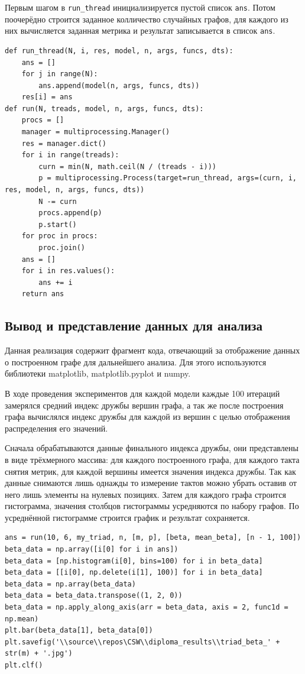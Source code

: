 \documentclass[bachelor, och, diploma]{SCWorks}
\begin{document}
Первым шагом в \texttt{run_thread} инициализируется пустой список \texttt{ans}. Потом поочерёдно строится заданное колличество случайных графов, для каждого из них вычисляется заданная метрика и результат записывается в список  \texttt{ans}.
\begin{verbatim}
def run_thread(N, i, res, model, n, args, funcs, dts):
    ans = []
    for j in range(N):
        ans.append(model(n, args, funcs, dts))
    res[i] = ans
def run(N, treads, model, n, args, funcs, dts):
    procs = []
    manager = multiprocessing.Manager()
    res = manager.dict()
    for i in range(treads):
        curn = min(N, math.ceil(N / (treads - i)))
        p = multiprocessing.Process(target=run_thread, args=(curn, i, res, model, n, args, funcs, dts))
        N -= curn
        procs.append(p)
        p.start()
    for proc in procs:
        proc.join()
    ans = []
    for i in res.values():
        ans += i
    return ans
\end{verbatim}
\subsection{Вывод и представление данных для анализа}
Данная реализация содержит фрагмент кода, отвечающий за отображение данных о построенном графе для дальнейшего анализа. Для этого используются библиотеки matplotlib, matplotlib.pyplot\cite{ptl} и numpy. 

В ходе проведения экспериментов для каждой модели каждые 100 итераций замерялся средний индекс дружбы вершин графа, а так же после построения графа вычислялся индекс дружбы для каждой из вершин с целью отображения распределения его значений. 

Сначала обрабатываются данные финального индекса дружбы, они представлены в виде трёхмерного массива: для каждого построенного графа, для каждого такта снятия метрик, для каждой вершины имеется значения индекса дружбы. Так как данные снимаются лишь однажды то измерение тактов можно убрать оставив от него лишь элементы на нулевых позициях. Затем для каждого графа  строится гистограмма, значения столбцов гистограммы усредняются по набору графов. По усреднённой гистограмме строится график и результат сохраняется. 
\begin{verbatim}
ans = run(10, 6, my_triad, n, [m, p], [beta, mean_beta], [n - 1, 100])
beta_data = np.array([i[0] for i in ans])
beta_data = [np.histogram(i[0], bins=100) for i in beta_data]
beta_data = [[i[0], np.delete(i[1], 100)] for i in beta_data]
beta_data = np.array(beta_data)
beta_data = beta_data.transpose((1, 2, 0))
beta_data = np.apply_along_axis(arr = beta_data, axis = 2, func1d = np.mean)
plt.bar(beta_data[1], beta_data[0])
plt.savefig('\\source\\repos\CSW\\diploma_results\\triad_beta_' + str(m) + '.jpg')
plt.clf()
\end{verbatim}
\end{document}
